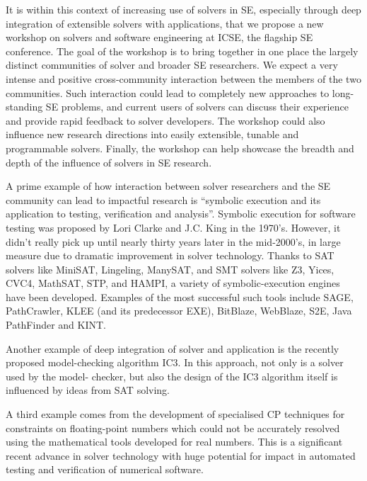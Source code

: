 \documentclass{sig-alternate}
\begin{document}
\vspace{0.2cm} It is within this context of increasing use of solvers
in SE, especially through deep integration of extensible solvers with
applications, that we propose a new workshop on solvers and software
engineering at ICSE, the flagship SE conference. The goal of the
workshop is to bring together in one place the largely distinct
communities of solver and broader SE researchers. We expect a very
intense and positive cross-community interaction between the members
of the two communities. Such interaction could lead to completely new
approaches to long-standing SE problems, and current users of solvers
can discuss their experience and provide rapid feedback to solver
developers. The workshop could also influence new research directions
into easily extensible, tunable and programmable solvers. Finally, the
workshop can help showcase the breadth and depth of the influence of
solvers in SE research.

\vspace{0.2cm} A prime example of how interaction between solver
researchers and the SE community can lead to impactful research is
``symbolic execution and its application to testing, verification and
analysis''. Symbolic execution for software testing was proposed by
Lori Clarke and J.C. King in the 1970's. However, it didn't really
pick up until nearly thirty years later in the mid-2000's, in large
measure due to dramatic improvement in solver technology. Thanks to
SAT solvers like MiniSAT, Lingeling, ManySAT, and SMT solvers like Z3,
Yices, CVC4, MathSAT, STP, and HAMPI, a variety of symbolic-execution
engines have been developed. Examples of the most successful such
tools include SAGE, PathCrawler, KLEE (and its predecessor EXE),
BitBlaze, WebBlaze, S2E, Java PathFinder and KINT.

\vspace{0.2cm} Another example of deep integration of solver and
application is the recently proposed model-checking algorithm IC3.  In
this approach, not only is a solver used by the model- checker, but
also the design of the IC3 algorithm itself is influenced by ideas
from SAT solving.

\vspace{0.2cm} A third example comes from the development of
specialised CP techniques for constraints on floating-point numbers
which could not be accurately resolved using the mathematical tools
developed for real numbers. This is a significant recent advance in
solver technology with huge potential for impact in automated testing
and verification of numerical software.
\end{document}
